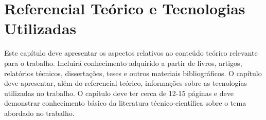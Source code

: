 \chapter{Referencial Teórico e Tecnologias Utilizadas}
\label{sec-referencial}

Este capítulo deve apresentar os aspectos relativos ao conteúdo teórico relevante para o trabalho.  Incluirá conhecimento adquirido a partir de livros, artigos, relatórios técnicos, dissertações, teses e outros materiais bibliográficos.  O capítulo deve apresentar, além do referencial teórico, informações sobre as tecnologias utilizadas no trabalho. O capítulo deve ter cerca de 12-15 páginas e deve demonstrar conhecimento básico da literatura técnico-científica sobre o tema abordado no trabalho.
